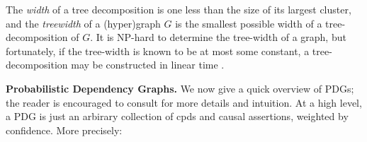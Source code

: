 \documentclass[twoside]{article}
\begin{document}
The \emph{width} of a tree decomposition is one less than the size of its largest cluster,
and the \emph{treewidth} of a (hyper)graph $G$ is the smallest
possible width of a tree-decomposition of $G$. 
It is NP-hard to determine the tree-width of a graph, but fortunately, if the tree-width is known to be at most some constant, a tree-decomposition may be constructed in linear time \parencite{badenbroek2021algorithm}.


\textbf{Probabilistic Dependency Graphs.}
We now give a quick overview of PDGs; the reader is encouraged to
consult \textcite{pdg-aaai,one-true-loss} for more details and intuition.
At a high level, a PDG
is just an arbirary collection of cpds and causal assertions,
    weighted by confidence. More precisely:
\end{document}
